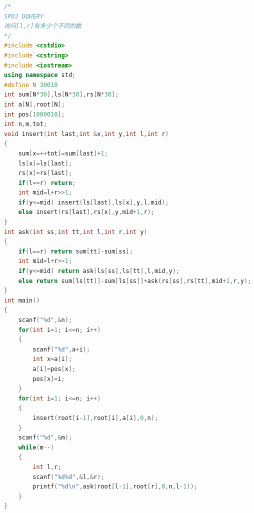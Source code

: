 \documentclass[UTF8,a4paper,titlepage]{ctexart}
\begin{document}
    \begin{lstlisting}[language=C++]
/*
SPOJ DQUERY
询问[l,r]有多少个不同的数
*/
#include <cstdio>
#include <cstring>
#include <iostream>
using namespace std;
#define N 30010
int sum[N*30],ls[N*30],rs[N*30];
int a[N],root[N];
int pos[1000010];
int n,m,tot;
void insert(int last,int &x,int y,int l,int r)
{
    sum[x=++tot]=sum[last]+1;
    ls[x]=ls[last];
    rs[x]=rs[last];
    if(l==r) return;
    int mid=l+r>>1;
    if(y<=mid) insert(ls[last],ls[x],y,l,mid);
    else insert(rs[last],rs[x],y,mid+1,r);
}
int ask(int ss,int tt,int l,int r,int y)
{
    if(l==r) return sum[tt]-sum[ss];
    int mid=l+r>>1;
    if(y<=mid) return ask(ls[ss],ls[tt],l,mid,y);
    else return sum[ls[tt]]-sum[ls[ss]]+ask(rs[ss],rs[tt],mid+1,r,y);
}
int main()
{
    scanf("%d",&n);
    for(int i=1; i<=n; i++)
    {
        scanf("%d",a+i);
        int x=a[i];
        a[i]=pos[x];
        pos[x]=i;
    }
    for(int i=1; i<=n; i++)
    {
        insert(root[i-1],root[i],a[i],0,n);
    }
    scanf("%d",&m);
    while(m--)
    {
        int l,r;
        scanf("%d%d",&l,&r);
        printf("%d\n",ask(root[l-1],root[r],0,n,l-1));
    }
}
    \end{lstlisting}
\end{document}
